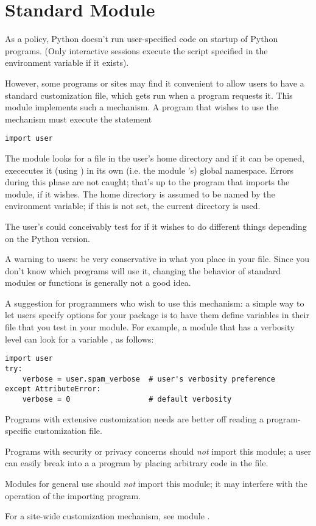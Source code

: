 \section{Standard Module }
\label{module-user}

As a policy, Python doesn't run user-specified code on startup of
Python programs.  (Only interactive sessions execute the script
specified in the  environment variable if it exists).

However, some programs or sites may find it convenient to allow users
to have a standard customization file, which gets run when a program
requests it.  This module implements such a mechanism.  A program
that wishes to use the mechanism must execute the statement

\begin{verbatim}
import user
\end{verbatim}

The  module looks for a file  in the user's
home directory and if it can be opened, exececutes it (using
) in its own (i.e. the module 's) global
namespace.  Errors during this phase are not caught; that's up to the
program that imports the  module, if it wishes.  The home
directory is assumed to be named by the  environment
variable; if this is not set, the current directory is used.

The user's  could conceivably test for
 if it wishes to do different things depending on
the Python version.

A warning to users: be very conservative in what you place in your
 file.  Since you don't know which programs will
use it, changing the behavior of standard modules or functions is
generally not a good idea.

A suggestion for programmers who wish to use this mechanism: a simple
way to let users specify options for your package is to have them
define variables in their  file that you test in
your module.  For example, a module  that has a verbosity
level can look for a variable , as follows:

\bcode\begin{verbatim}
import user
try:
    verbose = user.spam_verbose  # user's verbosity preference
except AttributeError:
    verbose = 0                  # default verbosity
\end{verbatim}\ecode

Programs with extensive customization needs are better off reading a
program-specific customization file.

Programs with security or privacy concerns should \emph{not} import
this module; a user can easily break into a a program by placing
arbitrary code in the  file.

Modules for general use should \emph{not} import this module; it may
interfere with the operation of the importing program.

For a site-wide customization mechanism, see module .
